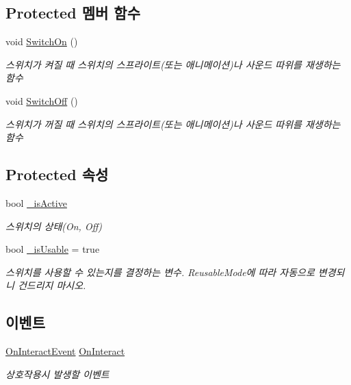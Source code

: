\subsection*{Protected 멤버 함수}
\begin{DoxyCompactItemize}
\item 
void \mbox{\hyperlink{class_switch_ad2aa17a4a56cc1fe70a96dc94371c388}{Switch\+On}} ()
\begin{DoxyCompactList}\small\item\em 스위치가 켜질 때 스위치의 스프라이트(또는 애니메이션)나 사운드 따위를 재생하는 함수 \end{DoxyCompactList}\item 
void \mbox{\hyperlink{class_switch_a1923f31d7df5390e442cf2ffa9d3292a}{Switch\+Off}} ()
\begin{DoxyCompactList}\small\item\em 스위치가 꺼질 때 스위치의 스프라이트(또는 애니메이션)나 사운드 따위를 재생하는 함수 \end{DoxyCompactList}\end{DoxyCompactItemize}
\subsection*{Protected 속성}
\begin{DoxyCompactItemize}
\item 
bool \mbox{\hyperlink{class_switch_aba91cb75ae6b195cdbddf65ea843370a}{\+\_\+is\+Active}}
\begin{DoxyCompactList}\small\item\em 스위치의 상태(\+On, Off) \end{DoxyCompactList}\item 
bool \mbox{\hyperlink{class_switch_a6cc73d0665cf08c9a43b10029a652b31}{\+\_\+is\+Usable}} = true
\begin{DoxyCompactList}\small\item\em 스위치를 사용할 수 있는지를 결정하는 변수. Reusable\+Mode에 따라 자동으로 변경되니 건드리지 마시오. \end{DoxyCompactList}\end{DoxyCompactItemize}
\subsection*{이벤트}
\begin{DoxyCompactItemize}
\item 
\mbox{\hyperlink{class_interactable_object_a70a579e4b09d53e6cb77b5222189d5eb}{On\+Interact\+Event}} \mbox{\hyperlink{class_interactable_object_afe5e0b16d86c2ed4abf4a71a1995f7ae}{On\+Interact}}
\begin{DoxyCompactList}\small\item\em 상호작용시 발생할 이벤트 \end{DoxyCompactList}\end{DoxyCompactItemize}
